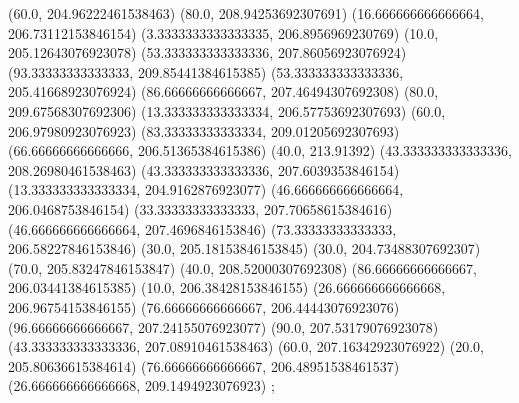 {{{		(60.0, 204.96222461538463)
		(80.0, 208.94253692307691)
		(16.666666666666664, 206.73112153846154)
		(3.3333333333333335, 206.8956969230769)
		(10.0, 205.12643076923078)
		(53.333333333333336, 207.86056923076924)
		(93.33333333333333, 209.85441384615385)
		(53.333333333333336, 205.41668923076924)
		(86.66666666666667, 207.46494307692308)
		(80.0, 209.67568307692306)
		(13.333333333333334, 206.57753692307693)
		(60.0, 206.97980923076923)
		(83.33333333333334, 209.01205692307693)
		(66.66666666666666, 206.51365384615386)
		(40.0, 213.91392)
		(43.333333333333336, 208.26980461538463)
		(43.333333333333336, 207.6039353846154)
		(13.333333333333334, 204.9162876923077)
		(46.666666666666664, 206.0468753846154)
		(33.33333333333333, 207.70658615384616)
		(46.666666666666664, 207.4696846153846)
		(73.33333333333333, 206.58227846153846)
		(30.0, 205.18153846153845)
		(30.0, 204.73488307692307)
		(70.0, 205.83247846153847)
		(40.0, 208.52000307692308)
		(86.66666666666667, 206.03441384615385)
		(10.0, 206.38428153846155)
		(26.666666666666668, 206.96754153846155)
		(76.66666666666667, 206.44443076923076)
		(96.66666666666667, 207.24155076923077)
		(90.0, 207.53179076923078)
		(43.333333333333336, 207.08910461538463)
		(60.0, 207.16342923076922)
		(20.0, 205.80636615384614)
		(76.66666666666667, 206.48951538461537)
		(26.666666666666668, 209.1494923076923)
	};

}}
